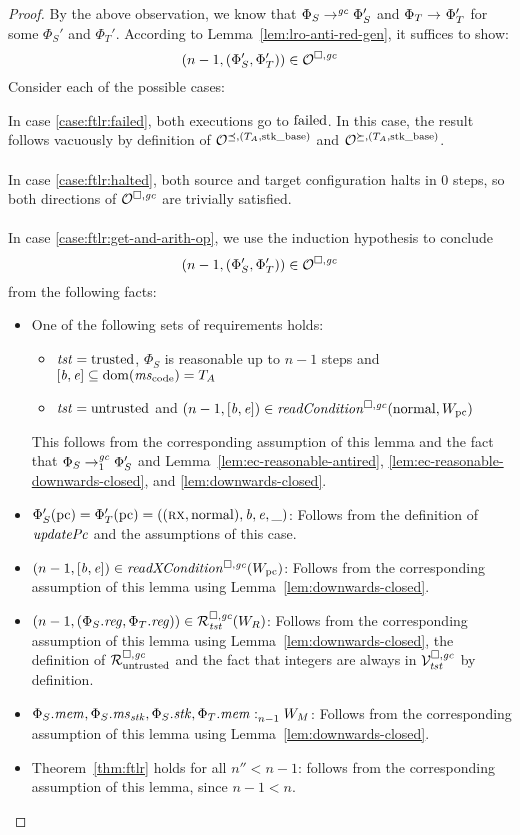 \begin{proof}
  By the above observation, we know that $\Phi_S \step[\gc] \Phi_S'$ and $\Phi_T \step
  \Phi_T'$ for some $\Phi_S'$ and $\Phi_T'$.
  According to Lemma~\ref{lem:lro-anti-red-gen}, it suffices to show:
  \[
    \npair[n-1]{(\Phi_S',\Phi_T')} \in \lro
  \]
  Consider each of the possible cases:

  In case \ref{case:ftlr:failed}, both executions go to $\failed$.
  In this case, the result follows vacuously by definition of $\lrol$ and $\lror$.
  \\\\
  In case \ref{case:ftlr:halted}, both source and target configuration halts in 0
  steps, so both directions of $\lro$ are trivially satisfied.
  \\\\
  In case \ref{case:ftlr:get-and-arith-op}, we use the induction hypothesis to conclude
  \[
    \npair[n-1]{(\Phi_S',\Phi_T')} \in \lro
  \]
  from the following facts:
  \begin{itemize}
  \item One of the following sets of requirements holds:
    \begin{itemize}
    \item $\trust = \trusted$, $\Phi_S$ is reasonable up to $n-1$ steps and $[\baddr,\eaddr] \subseteq \dom(\mscode) = \ta$
    \item $\trust = \untrusted$ and $\npair[n-1]{[\baddr,\eaddr]} \in \readCond{\normal,W_\pcreg}$
    \end{itemize}
    This follows from the corresponding assumption of this lemma and the fact that $\Phi_S \nstep[1]{\gc} \Phi_S'$ and Lemma~\ref{lem:ec-reasonable-antired}, \ref{lem:ec-reasonable-downwards-closed}, and \ref{lem:downwards-closed}.
  \item $\Phi_S'(\pcreg) = \Phi_T'(\pcreg) = ((\rx,\normal),\baddr,\eaddr,\_)$:
    Follows from the definition of $\updPcAddr{}$ and the assumptions of this case.
  \item $\npair[n-1]{[\baddr,\eaddr]} \in \xReadCond{W_\pcreg}$:
    Follows from the corresponding assumption of this lemma using Lemma~\ref{lem:downwards-closed}.
  \item $\npair[n-1]{(\Phi_S.\reg,\Phi_T.\reg)} \in \lrrg{\trust}(W_R)$:
    Follows from the corresponding assumption of this lemma using Lemma~\ref{lem:downwards-closed}, the definition of $\lrr$ and the fact that integers are always in $\lrvg{\trust}$ by definition.
  \item $\memSat[n-1]{\Phi_S.\mem,\Phi_S.\ms_\stk,\Phi_S.\stk,\Phi_T.\mem}{W_M}$:
    Follows from the corresponding assumption of this lemma using Lemma~\ref{lem:downwards-closed}.
  \item Theorem~\ref{thm:ftlr} holds for all $n'' < n-1$:
    follows from the corresponding assumption of this lemma, since $n - 1 < n$.
  \end{itemize}


\end{proof}
